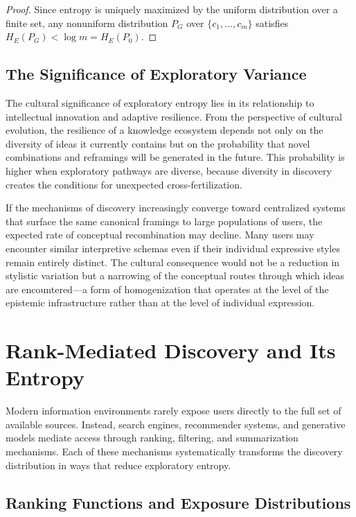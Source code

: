 \documentclass[12pt,a4paper]{article}
\theoremstyle{definition}
\theoremstyle{plain}
\theoremstyle{remark}
\newcommand{\HE}{H_{E}}
\begin{document}
\begin{proof}
Since entropy is uniquely maximized by the uniform distribution over a finite set, any
nonuniform distribution $P_G$ over $\{c_1, \ldots, c_m\}$ satisfies
$\HE(P_G) < \log m = \HE(P_0)$.
\end{proof}

\subsection{The Significance of Exploratory Variance}

The cultural significance of exploratory entropy lies in its relationship to intellectual
innovation and adaptive resilience. From the perspective of cultural evolution, the resilience
of a knowledge ecosystem depends not only on the diversity of ideas it currently contains but
on the probability that novel combinations and reframings will be generated in the future. This
probability is higher when exploratory pathways are diverse, because diversity in discovery
creates the conditions for unexpected cross-fertilization.

If the mechanisms of discovery increasingly converge toward centralized systems that surface
the same canonical framings to large populations of users, the expected rate of conceptual
recombination may decline. Many users may encounter similar interpretive schemas even if their
individual expressive styles remain entirely distinct. The cultural consequence would not be a
reduction in stylistic variation but a narrowing of the conceptual routes through which ideas
are encountered---a form of homogenization that operates at the level of the epistemic
infrastructure rather than at the level of individual expression.

\section{Rank-Mediated Discovery and Its Entropy}
\label{sec:rank}

Modern information environments rarely expose users directly to the full set of available
sources. Instead, search engines, recommender systems, and generative models mediate access
through ranking, filtering, and summarization mechanisms. Each of these mechanisms
systematically transforms the discovery distribution in ways that reduce exploratory entropy.

\subsection{Ranking Functions and Exposure Distributions}
\end{document}
